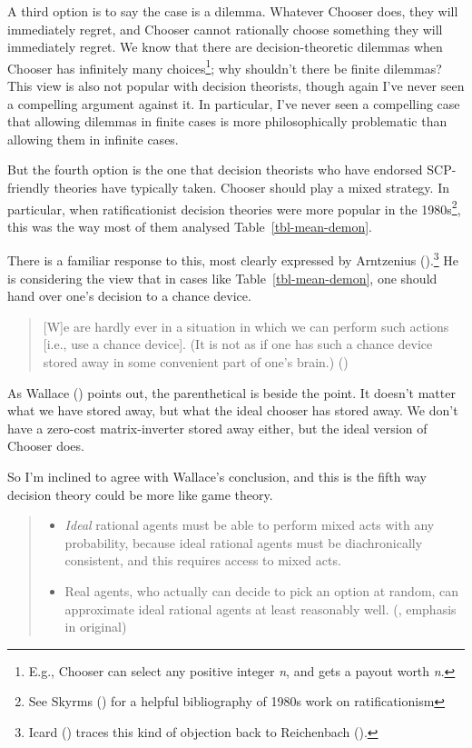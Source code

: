 \documentclass[
  11pt,
  letterpaper,
  DIV=11,
  numbers=noendperiod,
  twoside]{scrartcl}
\providecommand{\tightlist}{%
  \setlength{\itemsep}{0pt}\setlength{\parskip}{0pt}}
\begin{document}
A third option is to say the case is a dilemma. Whatever Chooser does,
they will immediately regret, and Chooser cannot rationally choose
something they will immediately regret. We know that there are
decision-theoretic dilemmas when Chooser has infinitely many
choices\footnote{E.g., Chooser can select any positive integer \emph{n},
  and gets a payout worth \emph{n}.}; why shouldn't there be finite
dilemmas? This view is also not popular with decision theorists, though
again I've never seen a compelling argument against it. In particular,
I've never seen a compelling case that allowing dilemmas in finite cases
is more philosophically problematic than allowing them in infinite
cases.

But the fourth option is the one that decision theorists who have
endorsed SCP-friendly theories have typically taken. Chooser should play
a mixed strategy. In particular, when ratificationist decision theories
were more popular in the 1980s\footnote{See Skyrms
  () for a helpful bibliography
  of 1980s work on ratificationism}, this was the way most of them
analysed Table~\ref{tbl-mean-demon}.

There is a familiar response to this, most clearly expressed by
Arntzenius ().\footnote{Icard
  () traces this kind of objection back to
  Reichenbach ().} He is considering
the view that in cases like Table~\ref{tbl-mean-demon}, one should hand
over one's decision to a chance device.

\begin{quote}
{[}W{]}e are hardly ever in a situation in which we can perform such
actions {[}i.e., use a chance device{]}. (It is not as if one has such a
chance device stored away in some convenient part of one's brain.)
()
\end{quote}

As Wallace () points out, the
parenthetical is beside the point. It doesn't matter what we have stored
away, but what the ideal chooser has stored away. We don't have a
zero-cost matrix-inverter stored away either, but the ideal version of
Chooser does.

So I'm inclined to agree with Wallace's conclusion, and this is the
fifth way decision theory could be more like game theory.

\begin{quote}
\begin{itemize}
\tightlist
\item
  \emph{Ideal} rational agents must be able to perform mixed acts with
  any probability, because ideal rational agents must be diachronically
  consistent, and this requires access to mixed acts.\\
\item
  Real agents, who actually can decide to pick an option at random, can
  approximate ideal rational agents at least reasonably well.
  (, emphasis in
  original)
\end{itemize}
\end{quote}
\end{document}
